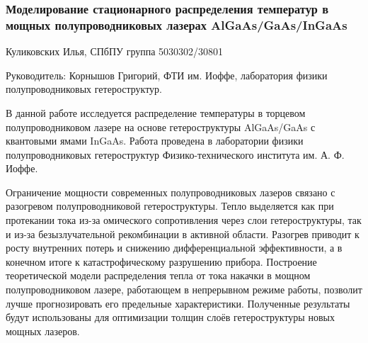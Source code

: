 \documentclass[a4paper, 12pt]{article}
\begin{document}
	\begin{center}
		\subsubsection*{Моделирование стационарного распределения температур в мощных полупроводниковых лазерах AlGaAs/GaAs/InGaAs}
		Куликовских Илья, СПбПУ группа 5030302/30801
		
		Руководитель: Корнышов Григорий, ФТИ им. Иоффе, лаборатория физики полупроводниковых гетероструктур.
	\end{center}
	
	\quad В данной работе исследуется распределение температуры в торцевом полупроводниковом лазере на основе гетероструктуры AlGaAs/GaAs с квантовыми ямами InGaAs. Работа проведена в лаборатории физики полупроводниковых гетероструктур Физико-технического института им. А. Ф. Иоффе.
	
	\quad Ограничение мощности современных полупроводниковых лазеров связано с разогревом полупроводниковой гетероструктуры. Тепло выделяется как при протекании тока из-за омического сопротивления через слои гетероструктуры, так и из-за безызлучательной рекомбинации в активной области. Разогрев приводит к росту внутренних потерь и снижению дифференциальной эффективности, а в конечном итоге к катастрофическому разрушению прибора. Построение теоретической модели распределения тепла от тока накачки в мощном полупроводниковом лазере, работающем в непрерывном режиме работы, позволит лучше прогнозировать его предельные характеристики. Полученные результаты будут использованы для оптимизации толщин слоёв гетероструктуры новых мощных лазеров. 
	
\end{document}
